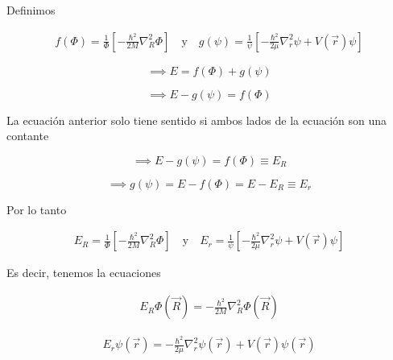 \begin{frame}{}
    
    Definimos
    
    \begin{align*}
        f( \Phi ) = \frac{1}{\Phi} \left[ - \frac{\hbar^2}{2M} \nabla^{2}_{R} \Phi \right]
        \quad \mathrm{y} \quad
        g( \psi ) = \frac{1}{\psi} \left[ - \frac{\hbar^2}{2 \mu } \nabla^{2}_{r} \psi + V( \Vec{r} ) \psi \right]
    \end{align*}
    
    \begin{equation*}
        \implies E = f( \Phi ) +g( \psi )
    \end{equation*}
    
    \begin{equation*}
        \implies E - g( \psi ) = f( \Phi )
    \end{equation*}
    
    La ecuación anterior solo tiene sentido si ambos lados de la ecuación son una contante
    
    \begin{equation*}
        \implies E - g( \psi ) = f( \Phi ) \equiv E_R
    \end{equation*}
    
    \begin{equation*}
        \implies g( \psi ) = E - f( \Phi ) = E- E_R \equiv E_r
    \end{equation*}
    
\end{frame}

\begin{frame}{}
    
    Por lo tanto 
    
    \begin{align*}
        E_R = \frac{1}{\Phi} \left[ - \frac{\hbar^2}{2M} \nabla^{2}_{R} \Phi \right]
        \quad \mathrm{y} \quad
        E_r = \frac{1}{\psi} \left[ - \frac{\hbar^2}{2 \mu } \nabla^{2}_{r} \psi + V( \Vec{r} ) \psi \right]
    \end{align*}
    
    Es decir, tenemos la ecuaciones
    
    \begin{tcolorbox}[colback=blue!5!white, colframe =blue!75!black, title= Las ecuaciones del problema de dos cuerpos]
        \begin{align*}
        E_R \Phi ( \Vec{R} ) = - \frac{\hbar^2}{2M} \nabla^{2}_{R}  \Phi ( \Vec{R} )
        \end{align*}
        
        \begin{align*}
            E_r \psi ( \Vec{r} ) =  - \frac{\hbar^2}{2 \mu } \nabla^{2}_{r} \psi ( \Vec{r} ) + V( \Vec{r} ) \psi ( \Vec{r} )
        \end{align*}
    \end{tcolorbox}
    
\end{frame}

